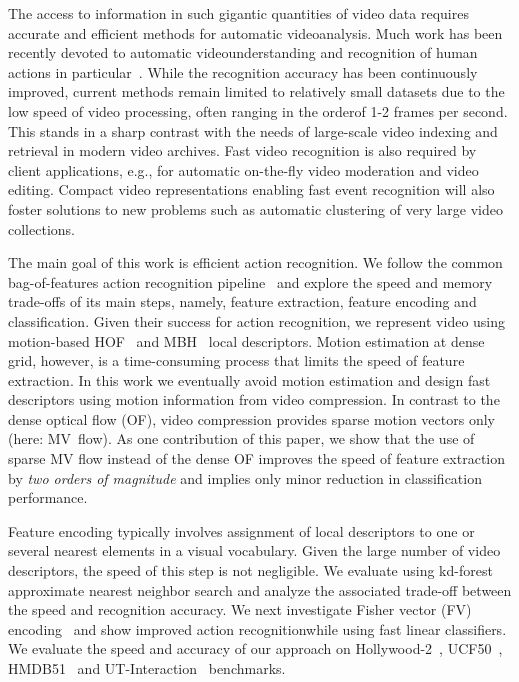 \documentclass[10pt,twocolumn,letterpaper]{article}
\begin{document}
The access to information in such gigantic quantities of video
data requires accurate and efficient methods for automatic videoanalysis. Much work has been recently devoted to automatic videounderstanding and recognition of human actions in
particular~\cite{Laptev08,Liu11,Niebles10,Sadanand12,Schuldt04,Wang12}.
While the recognition accuracy has been continuously improved,
current methods remain limited to relatively small datasets due
to the low speed of video processing, often ranging in the orderof 1-2 frames per second. This stands in a sharp contrast with
the needs of large-scale video indexing and retrieval in modern
video archives. Fast video recognition is also required by
client applications, e.g., for automatic on-the-fly video
moderation and video editing. Compact video representations
enabling fast event recognition will also foster solutions to
new problems such as automatic clustering of very large video
collections.

The main goal of this work is efficient action recognition. We
follow the common bag-of-features action recognition
pipeline~\cite{Laptev08,Schuldt04,Wang12} and explore the speed
and memory trade-offs of its main steps, namely, feature
extraction, feature encoding and classification. Given their
success for action recognition, we represent video
using motion-based HOF~\cite{Laptev08} and MBH~\cite{Wang12}
local descriptors. Motion estimation at dense grid, however, is
a time-consuming process that
limits the speed of feature extraction.
In this work we eventually avoid motion estimation and design
fast
descriptors using motion information from video compression.
In contrast to the dense optical flow (OF), video compression
provides sparse motion vectors only (here: MV~flow).
As one contribution of this paper, we show that the use of
sparse MV flow instead of the dense OF improves the speed of
feature extraction by {\em two orders of magnitude} and implies
only minor reduction in classification performance.

Feature encoding typically involves assignment of local
descriptors to one or several nearest elements in a visual
vocabulary. Given the large number of video descriptors, the
speed of this step is not negligible. We evaluate using
kd-forest approximate nearest neighbor search \cite{Philbin07}
and analyze the associated trade-off between the speed and
recognition accuracy. We next investigate Fisher vector (FV)
encoding~\cite{Perronnin12} and show improved action recognitionwhile using fast linear classifiers.
We evaluate the speed and accuracy of our approach on
\mbox{Hollywood-2}~\cite{Marszalek09}, UCF50~\cite{Reddy12},
HMDB51~\cite{Kuehne11} and UT-Interaction~\cite{Ryoo10}
benchmarks.
\end{document}
